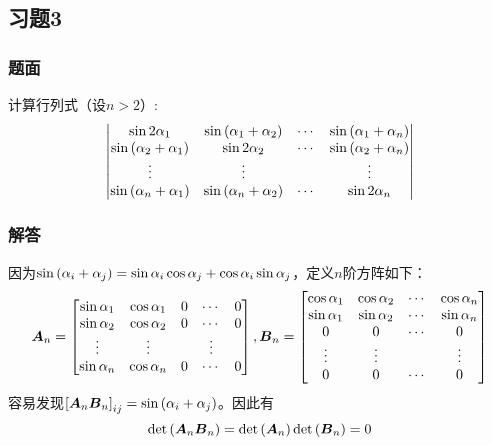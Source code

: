 \documentclass[9pt,xcolor=svgnames]{beamer} %
\begin{document}
\subsection*{习题3}
\begin{frame}
    \frametitle{题面}
    计算行列式（设\(n>2\)）:
    \begin{equation*}
        \begin{vmatrix}
            \sin 2\alpha_1                   & \sin\left( \alpha_{1}+\alpha_{2} \right) & \cdots & \sin\left( \alpha_{1}+\alpha_{n} \right) \\
            \sin\left( \alpha_{2}+\alpha_{1} \right) & \sin 2\alpha_2                   & \cdots & \sin\left( \alpha_{2}+\alpha_{n} \right) \\
            \vdots                           & \vdots                           &        & \vdots                           \\
            \sin\left( \alpha_{n}+\alpha_{1} \right) & \sin\left( \alpha_{n}+\alpha_{2} \right) & \cdots & \sin 2\alpha_n
        \end{vmatrix}
    \end{equation*}
\end{frame}
\begin{frame}
    \frametitle{解答}
    因为\(\sin\left( \alpha_i+\alpha_j \right)=\sin\alpha_i\cos\alpha_j+\cos\alpha_i\sin\alpha_j\)，定义\(n\)阶方阵如下：
    \begin{equation*}
        \boldsymbol{A}_n=
        \begin{bmatrix}
            \sin\alpha_{1} & \cos\alpha_{1} & 0 & \cdots & 0 \\
            \sin\alpha_{2} & \cos\alpha_{2} & 0 & \cdots & 0 \\
            \vdots         & \vdots         &   & \vdots     \\
            \sin\alpha_{n} & \cos\alpha_{n} & 0 & \cdots & 0
        \end{bmatrix},
        \boldsymbol{B}_n=
        \begin{bmatrix}
            \cos\alpha_{1} & \cos\alpha_{2} & \cdots & \cos\alpha_{n} \\
            \sin\alpha_{1} & \sin\alpha_{2} & \cdots & \sin\alpha_{n} \\
            0              & 0              & \cdots & 0              \\
            \vdots         & \vdots         &        & \vdots         \\
            0              & 0              & \cdots & 0
        \end{bmatrix}
    \end{equation*}
    容易发现\(\left[ \boldsymbol{A}_n\boldsymbol{B}_n \right]_{ij}=\sin\left( \alpha_i+\alpha_j \right)\)。因此有
    \begin{equation*}
        \mathrm{det}\left( \boldsymbol{A}_n\boldsymbol{B}_n \right)=\mathrm{det}\left( \boldsymbol{A}_n \right)\mathrm{det}\left( \boldsymbol{B}_n \right)=0
    \end{equation*}
\end{frame}
\end{document}
